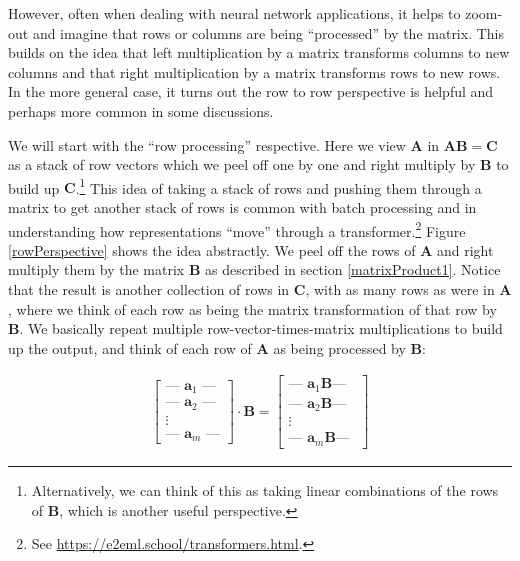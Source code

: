 However, often when dealing with neural network applications, it helps to zoom-out and imagine that rows or columns are being ``processed'' by the matrix. This builds on the idea that left multiplication by a matrix transforms columns to 
new columns and that right multiplication by a matrix transforms rows to new 
rows. In the more general case, it turns out the row to row perspective is 
helpful and perhaps more common in some discussions. 

We will start with the ``row processing'' respective. Here we view $\mathbf{A}$ in  $\mathbf{A}\mathbf{B} = \mathbf{C}$ as a stack of row vectors which we peel off one by one and right multiply by $\mathbf{B}$ to build up $\mathbf{C}$.\footnote{Alternatively, we can think of this as taking linear combinations of the rows of $\mathbf{B}$, which is another useful perspective.} This idea of taking a stack of rows and pushing them through a matrix to get another stack of rows is common with batch processing and in understanding how representations ``move'' through a transformer.\footnote{See \url{ https://e2eml.school/transformers.html}.} Figure \ref{rowPerspective} shows the idea abstractly. We peel off the rows of $\mathbf{A}$ and right multiply them by the matrix $\mathbf{B}$ as described in section \ref{matrixProduct1}. Notice that the result is another collection of rows in $\mathbf{C}$, with as many rows as were in $\mathbf{A}$, where we think of each row as being the matrix transformation of that row by $\mathbf{B}$. We basically repeat multiple row-vector-times-matrix multiplications to build up the output, and think of each row of $\mathbf{A}$ as being processed by $\mathbf{B}$:

\begin{align*}
\begin{bmatrix}
\text{--- } \mathbf{a}_1 \text{ ---} \\
\text{--- } \mathbf{a}_2 \text{ ---} \\
\vdots \\
\text{--- } \mathbf{a}_m \text{ ---}
\end{bmatrix}
\cdot
\mathbf{B}
=
\begin{bmatrix}
\text{--- } \mathbf{a}_1 \mathbf{B} \text{--- } \\
\text{--- } \mathbf{a}_2 \mathbf{B} \text{--- } \\
\vdots \\
\text{--- } \mathbf{a}_m \mathbf{B} \text{--- }
\end{bmatrix}
\end{align*}


